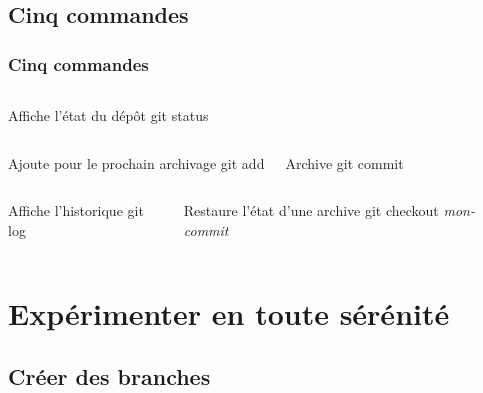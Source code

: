 \documentclass[t,11pt]{beamer}
\begin{document}
\subsection{Cinq commandes}
\begin{frame}[t]
        \frametitle{Cinq commandes}
        \begin{columns}
                \begin{block}{Affiche l'\'etat du d\'ep\^ot}
                        \centering
                        git status
                \end{block}
        \end{columns}

        \begin{columns}
                \begin{block}{Ajoute pour le prochain archivage}
                        \centering
                        git add
                \end{block}

                \begin{block}{Archive}
                        \centering
                        git commit
                \end{block}
        \end{columns}

        \begin{columns}
                \begin{block}{Affiche l'historique}
                        \centering
                        git log
                \end{block}

                \begin{block}{Restaure l'\'etat d'une archive}
                        \centering
                        git checkout \emph{mon-commit}
                \end{block}
        \end{columns}
\end{frame}

\section{Exp\'erimenter en toute s\'er\'enit\'e}

\subsection{Cr\'eer des branches}
\end{document}
